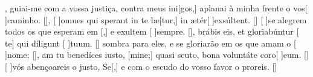 {    {, guiai-me com a vossa justiça, contra meus ini[gos,] aplanai à minha frente o vos[ ]{ca}{mi}nho. [\LinkPT]},
  {[ ]{om}nes qui sperant in te læ[tur,] in ætér[ ]{ex}{súl}\-tent. [\LinkLA]}%
    {[ ]{se} alegrem todos os que esperam em [,] e exultem [ ]{sem}pre. [\LinkPT]},
  {brábis eis, et gloriabúntur [ te] qui díligunt [ ]{tu}um. [\LinkLA]}%
    { sombra para eles, e se gloriarão em  os que amam o [ ]{no}me; [\LinkPT]},
  {am tu benedíces iusto, [mine;] quasi scuto, bona voluntáte coro[ ]{e}um. [\LinkLA]}%
    {[ ]{vós} abençoareis o justo, Se[,] e com o escudo do vosso favor o proreis. [\LinkPT]}
}